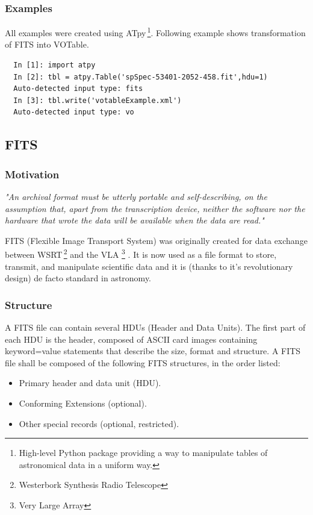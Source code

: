 \subsubsection*{Examples}
All examples were created using ATpy\,\footnote{High-level Python
  package providing a way to manipulate tables of astronomical data in
  a uniform way.}. Following example shows transformation of FITS into
VOTable.

\begin{lstlisting}
  In [1]: import atpy
  In [2]: tbl = atpy.Table('spSpec-53401-2052-458.fit',hdu=1)
  Auto-detected input type: fits
  In [3]: tbl.write('votableExample.xml')
  Auto-detected input type: vo
\end{lstlisting}

\subsection{FITS}
\subsubsection*{Motivation}
\emph{
"An archival format must be utterly portable and self-describing, on
the assumption that, apart from the transcription device, neither the
software nor the hardware that wrote the data will be available when
the data are read."} \citep{nrc1995}


\bigskip

FITS (Flexible Image Transport System) was originally created for data
exchange between WSRT\,\footnote{Westerbork Synthesis Radio Telescope}
and the VLA \footnote{Very Large Array} \citep{fits1997}. It is now
used as a file format to store, transmit, and manipulate scientific
data and it is (thanks to it's revolutionary design) de facto standard
in astronomy.


\subsubsection*{Structure}

A FITS file can contain several HDUs (Header and Data Units). The
first part of each HDU is the header, composed of ASCII card images
containing \textrm{keyword=value} statements that describe the size,
format and structure. A FITS file shall be composed of the following
FITS structures, in the order listed:

\begin{itemize}
\item Primary header and data unit (HDU).
\item Conforming Extensions (optional).
\item Other special records (optional, restricted).
\end{itemize}


